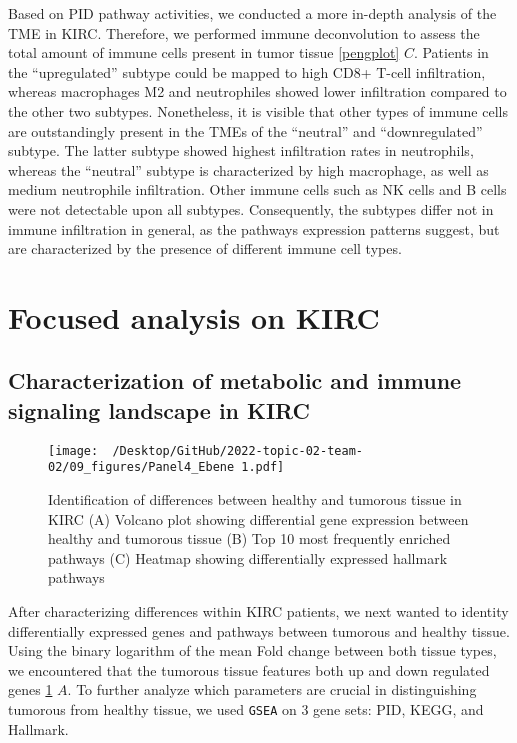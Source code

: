 \documentclass[
  parskip,
  oneside]{scrreprt}
\begin{document}
Based on PID pathway activities, we conducted a more in-depth analysis
of the TME in KIRC. Therefore, we performed immune deconvolution to
assess the total amount of immune cells present in tumor tissue
\cref{pengplot} \(C\). Patients in the ``upregulated'' subtype could be
mapped to high CD8+ T-cell infiltration, whereas macrophages M2 and
neutrophiles showed lower infiltration compared to the other two
subtypes. Nonetheless, it is visible that other types of immune cells
are outstandingly present in the TMEs of the ``neutral'' and
``downregulated'' subtype. The latter subtype showed highest
infiltration rates in neutrophils, whereas the ``neutral'' subtype is
characterized by high macrophage, as well as medium neutrophile
infiltration. Other immune cells such as NK cells and B cells were not
detectable upon all subtypes. Consequently, the subtypes differ not in
immune infiltration in general, as the pathways expression patterns
suggest, but are characterized by the presence of different immune cell
types.

\hypertarget{focused-analysis-on-kirc}{%
\section{Focused analysis on KIRC}\label{focused-analysis-on-kirc}}

\hypertarget{characterization-of-metabolic-and-immune-signaling-landscape-in-kirc}{%
\subsection{Characterization of metabolic and immune signaling landscape
in
KIRC}\label{characterization-of-metabolic-and-immune-signaling-landscape-in-kirc}}

\begin{figure}[h]
  \texttt{[image: ~/Desktop/GitHub/2022-topic-02-team-02/09\_figures/Panel4\_Ebene 1.pdf]}
  \caption{Identification of differences between healthy and tumorous tissue in KIRC (A) Volcano plot showing differential gene expression between healthy and tumorous tissue (B) Top 10 most frequently enriched pathways (C) Heatmap showing differentially expressed hallmark pathways}
  \label{volcano}
\end{figure}

After characterizing differences within KIRC patients, we next wanted to
identity differentially expressed genes and pathways between tumorous
and healthy tissue. Using the binary logarithm of the mean Fold change
between both tissue types, we encountered that the tumorous tissue
features both up and down regulated genes \cref{volcano} \(A\). To
further analyze which parameters are crucial in distinguishing tumorous
from healthy tissue, we used \texttt{GSEA} on 3 gene sets: PID, KEGG,
and Hallmark.
\end{document}
